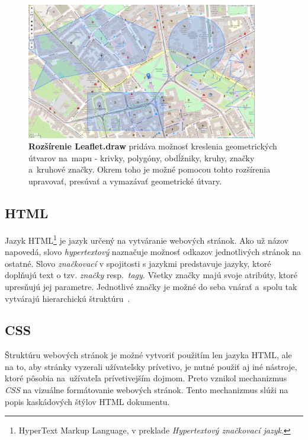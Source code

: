 \begin{figure}[ht]
    \centering
    \includegraphics[width=0.9\textwidth]{obrazky-figures/leaflet-draw-screenshot.png}
    \caption{\textbf{Rozšírenie Leaflet.draw} pridáva možnosť kreslenia geometrických útvarov na~mapu \-- krivky, polygóny, obdĺžniky, kruhy, značky a~kruhové značky. Okrem toho je možné pomocou tohto rozšírenia upravovať, presúvať a vymazávať geometrické útvary.}
    \label{fig:leafletdraw}
\end{figure}

\subsection{HTML}
Jazyk HTML\footnote{HyperText Markup Language, v preklade \emph{Hypertextový značkovací jazyk}.} je jazyk určený na vytváranie webových stránok. Ako už názov napovedá, slovo \emph{hypertextový} naznačuje možnosť odkazov jednotlivých stránok na ostatné. Slovo \emph{značkovací} v spojitosti s jazykmi predstavuje jazyky, ktoré doplňujú text o tzv. \emph{značky} resp.~\emph{tagy}. Všetky značky majú svoje atribúty, ktoré upresňujú jej parametre. Jednotlivé značky je možné do seba vnárať a~spolu tak vytvárajú hierarchickú štruktúru~\cite{kosek1998html}.

\subsection{CSS}
Štruktúru webových stránok je možné vytvoriť použitím len jazyka HTML, ale na to, aby stránky vyzerali užívateľsky prívetivo, je nutné použiť aj iné nástroje, ktoré pôsobia na~užívateľa prívetivejším dojmom. Preto vznikol mechanizmus \emph{CSS} na vizuálne formátovanie webových stránok. Tento mechanizmus slúži na popis kaskádových štýlov HTML dokumentu.

